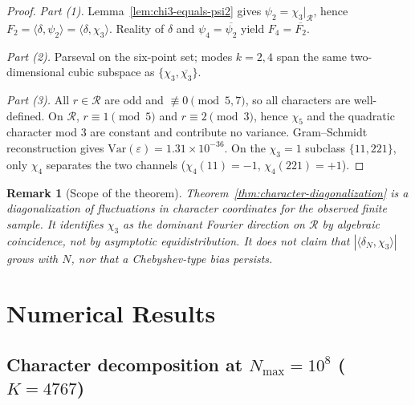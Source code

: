 \documentclass[11pt,a4paper]{article}
\newtheorem{remark}{Remark}
\newcommand{\R}{\mathcal{R}}
\newcommand{\Var}{\mathrm{Var}}
\begin{document}
\begin{proof}
\emph{Part (1).}
Lemma~\ref{lem:chi3-equals-psi2} gives $\psi_2=\chi_3|_{\R}$, hence
$F_2=\langle\delta,\psi_2\rangle=\langle\delta,\chi_3\rangle$.
Reality of $\delta$ and $\psi_4=\overline{\psi_2}$ yield $F_4=\overline{F_2}$.

\emph{Part (2).}
Parseval on the six-point set; modes $k=2,4$ span the same two-dimensional
cubic subspace as $\{\chi_3,\overline{\chi_3}\}$.

\emph{Part (3).}
All $r\in\R$ are odd and $\not\equiv 0\pmod{5,7}$, so all characters are
well-defined.
On $\R$, $r\equiv 1\pmod 5$ and $r\equiv 2\pmod 3$, hence $\chi_5$ and
the quadratic character mod $3$ are constant and contribute no variance.
Gram--Schmidt reconstruction gives
$\Var(\varepsilon)=1.31\times 10^{-36}$.
On the $\chi_3=1$ subclass $\{11,221\}$, only $\chi_4$ separates the two
channels ($\chi_4(11)=-1$, $\chi_4(221)=+1$).
\end{proof}

\begin{remark}[Scope of the theorem]
Theorem~\ref{thm:character-diagonalization} is a \emph{diagonalization of
fluctuations in character coordinates} for the observed finite sample.
It identifies $\chi_3$ as the dominant Fourier direction on $\R$ by
\emph{algebraic} coincidence, not by asymptotic equidistribution.
It does \emph{not} claim that $|\langle\delta_N,\chi_3\rangle|$ grows with $N$,
nor that a Chebyshev-type bias persists.
\end{remark}

\section{Numerical Results}
\label{sec:numerical}

\subsection{Character decomposition at $N_{\max}=10^8$ ($K=4767$)}
\end{document}
